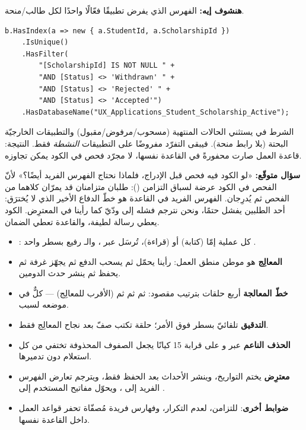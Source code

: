 \textbf{هنشوف إيه:} الفهرس الذي يفرض تطبيقًا فعّالًا واحدًا لكل طالب/منحة.

\begin{english}
\begin{lstlisting}[language={[Sharp]C}]
b.HasIndex(a => new { a.StudentId, a.ScholarshipId })
    .IsUnique()
    .HasFilter(
        "[ScholarshipId] IS NOT NULL " +
        "AND [Status] <> 'Withdrawn' " +
        "AND [Status] <> 'Rejected' " +
        "AND [Status] <> 'Accepted'")
    .HasDatabaseName("UX_Applications_Student_Scholarship_Active");
\end{lstlisting}
\end{english}

الشرط في  يستثني الحالات المنتهية (مسحوب/مرفوض/مقبول) والتطبيقات الخارجيّة
البحتة (بلا رابط منحة). فيبقى التفرّد مفروضًا على التطبيقات \emph{النشطة} فقط. النتيجة:
قاعدة العمل صارت محفورةً في القاعدة نفسها، لا مجرّد فحص في الكود يمكن تجاوزه.

\begin{qa}
\textbf{سؤال متوقّع:} «لو الكود فيه فحص قبل الإدراج، فلماذا نحتاج الفهرس الفريد أيضًا؟»
لأنّ الفحص في الكود عرضة لسباق التزامن (): طلبان متزامنان قد يمرّان
كلاهما من الفحص ثم يُدرِجان. الفهرس الفريد في القاعدة هو خطّ الدفاع الأخير الذي لا
يُخترَق: أحد الطلبين يفشل حتمًا، ونحن نترجم فشله إلى  ودّيّ كما
رأينا في المعترِض. الكود يعطي رسالة لطيفة، والقاعدة تعطي الضمان.
\end{qa}

\begin{summary}
\begin{itemize}
\item \textbf{}: كل عملية إمّا  (كتابة) أو  (قراءة)،
  تُرسَل عبر ، والـ  رفيع بسطر واحد .
\item \textbf{المعالِج} هو موطن منطق العمل: رأينا  يحمّل ثم
  يسحب الدفع ثم يجهّز غرفة  ثم يحفظ ثم ينشر حدث الدومين.
\item \textbf{خطّ المعالجة} أربع حلقات بترتيب مقصود:  ثم  ثم
   ثم  (الأقرب للمعالِج) — كلٌّ في موضعه لسبب.
\item \textbf{التدقيق} تلقائيّ بسطر \code{[Auditable]} فوق الأمر؛ حلقة  تكتب صفّ
   بعد نجاح المعالِج فقط.
\item \textbf{الحذف الناعم} عبر  و على قرابة 15
  كيانًا يجعل الصفوف المحذوفة تختفي من كل استعلام دون تدميرها.
\item \textbf{معترِض } يختم التواريخ، وينشر الأحداث بعد الحفظ فقط،
  ويترجم تعارض الفهرس الفريد إلى ، ويحوّل مفاتيح المستخدم إلى
  .
\item \textbf{ضوابط أخرى}:  للتزامن،  لعدم التكرار،
  وفهارس فريدة مُصفّاة تحفر قواعد العمل داخل القاعدة نفسها.
\end{itemize}
\end{summary}
